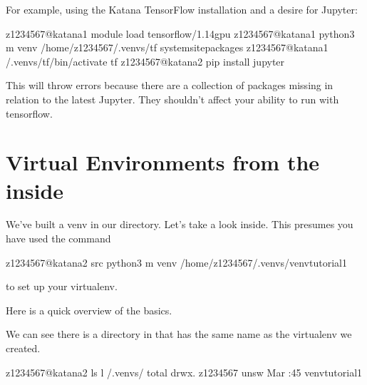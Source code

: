 \documentclass[letterpaper,10pt,english]{sphinxmanual}
\begin{document}
For example, using the Katana TensorFlow installation and a desire for Jupyter:

\begin{sphinxVerbatim}[commandchars=\\\{\}]
\PYG{o}{[}z1234567@katana1 \PYGZti{}\PYG{o}{]}\PYGZdl{} module load tensorflow/1.14gpu
\PYG{o}{[}z1234567@katana1 \PYGZti{}\PYG{o}{]}\PYGZdl{} python3 \PYGZhy{}m venv /home/z1234567/.venvs/tf \PYGZhy{}\PYGZhy{}system\PYGZhy{}site\PYGZhy{}packages
\PYG{o}{[}z1234567@katana1 \PYGZti{}\PYG{o}{]}\PYGZdl{}  \PYGZti{}/.venvs/tf/bin/activate
tf \PYG{o}{[}z1234567@katana2 \PYGZti{}\PYG{o}{]}\PYGZdl{} pip install jupyter
\end{sphinxVerbatim}

This will throw errors because there are a collection of packages missing in relation to the latest Jupyter. They shouldn’t affect your ability to run {\hyperref[\detokenize{software/python-jupyter-notebooks:jupyter-notebooks}]{}} with tensorflow.


\section{Virtual Environments from the inside}
\label{\detokenize{software/python-virtualenvs-internals:virtual-environments-from-the-inside}}\label{\detokenize{software/python-virtualenvs-internals::doc}}
We’ve built a venv in our  directory. Let’s take a look inside. This presumes you have used the command

\begin{sphinxVerbatim}[commandchars=\\\{\}]
\PYG{o}{[}z1234567@katana2 src\PYG{o}{]}\PYGZdl{} python3 \PYGZhy{}m venv /home/z1234567/.venvs/venv\PYGZhy{}tutorial\PYGZhy{}1
\end{sphinxVerbatim}

to set up your virtualenv.

Here is a quick overview of the basics.

We can see there is a directory in  that has the same name as the virtualenv we created.

\begin{sphinxVerbatim}[commandchars=\\\{\}]
\PYG{o}{[}z1234567@katana2 \PYGZti{}\PYG{o}{]}\PYGZdl{} ls \PYGZhy{}l \PYGZti{}/.venvs/
total 
drwx\PYGZhy{}\PYGZhy{}\PYGZhy{}\PYGZhy{}\PYGZhy{}\PYGZhy{}.   z1234567 unsw    Mar  :45 venv\PYGZhy{}tutorial\PYGZhy{}1
\end{sphinxVerbatim}
\end{document}
